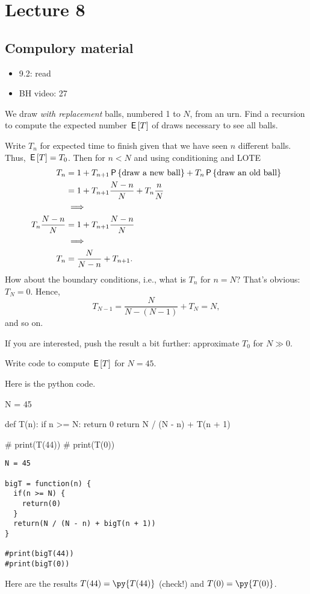 \section{Lecture 8}


\subsection{Compulory material}

\begin{itemize}
\item 9.2: read
\item BH video: 27
\end{itemize}


\begin{exercise}
We draw \emph{with replacement} balls, numbered 1 to $N$, from an urn.
Find a recursion to compute the expected number $\E T$ of draws necessary to see all balls.
\begin{solution}
Write $T_{n}$ for expected time to finish given that we have seen $n$ different balls. Thus, $\E T = T_{0}$.
Then for $n< N$ and using conditioning and LOTE
\begin{align}
T_n
&= 1
+T_{n+1} \P{\text{draw a new ball}}
+T_{n} \P{\text{draw an old ball}}  \\
&= 1
+T_{n+1} \frac{N-n}{N}
+T_{n} \frac{n}{N} \\
&\implies\\
T_n \frac{N-n}{N} &= 1 +T_{n+1} \frac{N-n}{N} \\
&\implies \\
T_n &= \frac{N}{N-n}  +T_{n+1}.
\end{align}
How about the boundary conditions, i.e., what is $T_{n}$ for $n=N$?
That's obvious: $T_{N} = 0$. Hence,
\begin{equation}
T_{N-1} = \frac{N}{N-(N-1)} + T_{N} = N,
\end{equation}
and so on.

If you are interested,  push the result a bit further: approximate $T_{0}$ for $N\gg 0$.
\end{solution}
\end{exercise}


\begin{exercise}
Write code to compute $\E T$ for $N=45$.
\begin{solution}
Here is the python code.

\begin{pyblock}
N = 45


def T(n):
    if n >= N:
        return 0
    return N / (N - n) + T(n + 1)

# print(T(44))
# print(T(0))
\end{pyblock}
\begin{verbatim}
N = 45

bigT = function(n) {
  if(n >= N) {
    return(0)
  }
  return(N / (N - n) + bigT(n + 1))
}

#print(bigT(44))
#print(bigT(0))
\end{verbatim}
Here are the results $T(44) = \py{T(44)}$ (check!) and $T(0) = \py{T(0)}$.
\end{solution}
\end{exercise}


